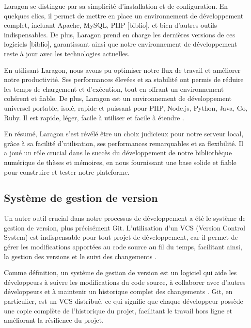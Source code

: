 Laragon se distingue par sa simplicité d'installation et de configuration. En quelques clics, il permet de mettre en place un environnement de développement complet, incluant Apache, MySQL, PHP [biblio], et bien d'autres outils indispensables. De plus, Laragon prend en charge les dernières versions de ces logiciels [biblio], garantissant ainsi que notre environnement de développement reste à jour avec les technologies actuelles.


En utilisant Laragon, nous avons pu optimiser notre flux de travail et améliorer notre productivité. Ses performances élevées et sa stabilité ont permis de réduire les temps de chargement et d'exécution, tout en offrant un environnement cohérent et fiable. De plus, 
Laragon est un environnement de développement universel portable, isolé, rapide et puissant pour PHP, Node.js, Python, Java, Go, Ruby. Il est rapide, léger, facile à utiliser et facile à étendre \cite{laragon.org}.

En résumé, Laragon s'est révélé être un choix judicieux pour notre serveur local, grâce à sa facilité d'utilisation, ses performances remarquables et sa flexibilité. Il a joué un rôle crucial dans le succès du développement de notre bibliothèque numérique de thèses et mémoires, en nous fournissant une base solide et fiable pour construire et tester notre plateforme.

\subsection{Système de gestion de version}
Un autre outil crucial dans notre processus de développement a été le système de gestion de version, plus précisément Git. L'utilisation d'un VCS (Version Control System) est indispensable pour tout projet de développement, car il permet de gérer les modifications apportées au code source au fil du temps, facilitant ainsi, la gestion des versions et le suivi des changements \cite{loeliger2012version}.
\par 

Comme définition, un système de gestion de version est un logiciel qui aide les développeurs à suivre les modifications du code source, à collaborer avec d'autres développeurs et à maintenir un historique complet des changements \cite{zolkifli2018version}. Git, en particulier, est un VCS distribué, ce qui signifie que chaque développeur possède une copie complète de l'historique du projet, facilitant le travail hors ligne et améliorant la résilience du projet.


